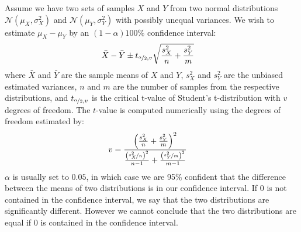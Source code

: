 \documentclass[thesis.tex]{subfiles}
\begin{document}
Assume we have two sets of samples $X$ and $Y$ from two normal distributions $\mathcal{N}(\mu_X,\sigma_X^2)$ and $\mathcal{N}(\mu_Y,\sigma_Y^2)$ with possibly unequal variances. We wish to estimate $\mu_X - \mu_Y$ by an $(1-\alpha) 100\%$ confidence interval:
\begin{align*}
	\bar{X} - \bar{Y} &\pm t_{\nicefrac{\alpha}{2},v} \sqrt{\frac{s^2_X}{n} + \frac{s^2_Y}{m}}
\end{align*}
where $\bar{X}$ and $\bar{Y}$ are the sample means of $X$ and $Y$, $s^2_X$ and $s^2_Y$ are the unbiased estimated variances, $n$ and $m$ are the number of samples from the respective distributions, and $t_{\nicefrac{\alpha}{2},v}$ is the critical t-value of Student's t-distribution with $v$ degrees of freedom. The $t$-value is computed numerically using the degrees of freedom estimated by:
\begin{align*}
	v &= \frac{\left( \frac{s_X^2}{n} + \frac{s_Y^2}{m} \right)^2}{\frac{\left(\nicefrac{s_X^2}{n} \right)^2}{n-1} + \frac{\left(\nicefrac{s_Y^2}{m}\right)^2}{m-1}}
\end{align*}
$\alpha$ is usually set to $0.05$, in which case we are 95\% confident that the difference between the means of two distributions is in our confidence interval. If 0 is not contained in the confidence interval, we say that the two distributions are significantly different. However we cannot conclude that the two distributions are equal if 0 is contained in the confidence interval.

%
%
%
%
%
%
%
%
%

\subbibliography
\end{document}
